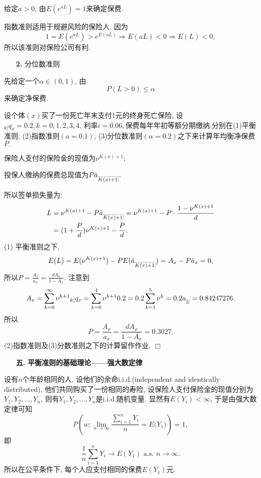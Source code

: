 \documentclass[a4paper,openany, 10pt]{ctexbook}
\makeatletter
\newcommand{\hei}{\CJKfamily{hei}}      %
\def\qed{\hfill$\Box$\medskip}
\def\z{\left}
\def\y{\right}
\DeclareRobustCommand{\annu}[1]{_{%
    \def\arraystretch{0}%
    \setlength\arraycolsep{1pt}%
    \setlength\arrayrulewidth{.2pt}%
    \begin{array}[b]{@{}c|}\hline
        \\[\arraycolsep]%
        \scriptstyle #1%
    \end{array}%
}}
\makeatother
\begin{document}
给定$a>0$, 由$E(e^{aL})=1$来确定保费.
\begin{remark}
 指数准则适用于规避风险的保险人. 因为
$$1=E(e^{aL})>e^{E(aL)}\Rightarrow E(aL)<0\Rightarrow E(L)<0,$$
所以该准则对保险公司有利.
\end{remark}

\begin{itemize}
    \item[{\bf\hei2.}] 分位数准则
\end{itemize}

先给定一个$\alpha\in (0,1)$, 由$$P(L>0)\leqslant\alpha$$来确定净保费.
\begin{example}\label{e4.1}
   设个体$(x)$买了一份死亡年末支付1元的终身死亡保险, 设$_{k| }q_x=0.2,k=0,1,2,3,4$, 利率$i=0.06,$保费每年年初等额分期缴纳.分别在(1)平衡准则, (2)指数准则$(a=0.1)$, (3)分位数准则$(\alpha=0.2)$之下来计算年均衡净保费$P.$
\end{example}
\solution 保险人支付的保险金的现值为$\nu^{K(x)+1};$

投保人缴纳的保费总现值为$P\ddot a_{\annu {K(x)+1}}.$

所以签单损失量为:
\begin{align*}
    L & =\nu^{K(x)+1}-P\ddot a_{\annu {K(x)+1}}=\nu^{K(x)+1}-P\cdot\frac{1-\nu^{K(x)+1}}{d} \\
        & =(1+\frac{P}{d})\nu^{K(x)+1}-\frac{P}{d}. \\
\end{align*}
(1) 平衡准则之下,
$$E(L)=E(\nu^{K(x)+1})-PE(\ddot a_{\annu {K(x)+1}})=A_x-P\ddot a_{x}=0,$$
所以$P=\frac{A_x}{\ddot a_{x}}=\frac{dA_x}{1-A_x}.$
注意到$$
    A_x  =\sum_{k=0}^{\infty }{\nu^{k+1}{}_{k|}q_x}=\sum_{k=0}^4{\nu^{k+1}0.2}=0.2\sum_{k=1}^{5}{\nu^k}=0.2a_{\annu 5}=0.84247276.
$$
所以$$P=\frac{A_x}{\ddot a_{x}}=\frac{dA_x}{1-A_x}=0.3027.$$
(2)指数准则及(3)分数准则之下的计算留作作业. \qed

\begin{itemize}
    \item[{\bf\hei 五.}]{\bf\hei 平衡准则的基础理论——强大数定律}
\end{itemize}

设有$n$个年龄相同的人, 设他们的余命i.i.d.(independent and identically distributed), 他们共同购买了一份相同的寿险, 设保险人支付保险金的现值分别为$Y_1,Y_2,...,Y_n$, 则有$Y_1,Y_2,...,Y_n$是i.i.d.随机变量. 显然有$E(Y_i)<\infty$, 于是由强大数定律可知
$$P\z({w:\underset{n\rightarrow \infty}{\lim}\frac{\sum_{i=1}^{n}{Y_i}}{n}=E(Y_1})\y)=1,$$ 即
$$\frac{1}{n}\sum_{i=1}^n{Y_i}\rightarrow E(Y_1)\text{ a.s. }n\rightarrow\infty.$$
所以在公平条件下, 每个人应支付相同的保费$E(Y_1)$元.
\end{document}
